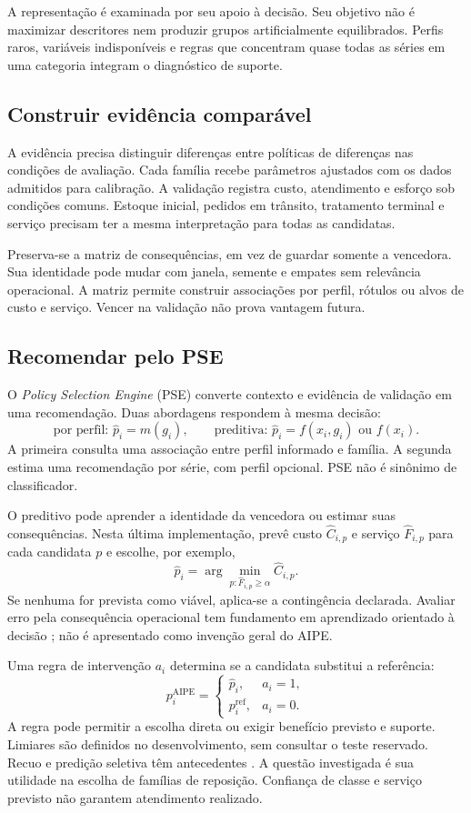 A representação é examinada por seu apoio à decisão. Seu objetivo não é maximizar descritores nem produzir grupos artificialmente equilibrados. Perfis raros, variáveis indisponíveis e regras que concentram quase todas as séries em uma categoria integram o diagnóstico de suporte.

\subsection{Construir evidência comparável}
A evidência precisa distinguir diferenças entre políticas de diferenças nas condições de avaliação. Cada família recebe parâmetros ajustados com os dados admitidos para calibração. A validação registra custo, atendimento e esforço sob condições comuns. Estoque inicial, pedidos em trânsito, tratamento terminal e serviço precisam ter a mesma interpretação para todas as candidatas.

Preserva-se a matriz de consequências, em vez de guardar somente a vencedora. Sua identidade pode mudar com janela, semente e empates sem relevância operacional. A matriz permite construir associações por perfil, rótulos ou alvos de custo e serviço. Vencer na validação não prova vantagem futura.

\subsection{Recomendar pelo PSE}
O \textit{Policy Selection Engine} (PSE) converte contexto e evidência de validação em uma recomendação. Duas abordagens respondem à mesma decisão:
\[
 \text{por perfil: }\widehat p_i=m(g_i),\qquad
 \text{preditiva: }\widehat p_i=f(x_i,g_i)\text{ ou }f(x_i).
\]
A primeira consulta uma associação entre perfil informado e família. A segunda estima uma recomendação por série, com perfil opcional. PSE não é sinônimo de classificador.

O preditivo pode aprender a identidade da vencedora ou estimar suas consequências. Nesta última implementação, prevê custo $\widehat C_{i,p}$ e serviço $\widehat F_{i,p}$ para cada candidata $p$ e escolhe, por exemplo,
\[
 \widehat p_i=\arg\min_{p:\widehat F_{i,p}\geq\alpha}\widehat C_{i,p}.
\]
Se nenhuma for prevista como viável, aplica-se a contingência declarada. Avaliar erro pela consequência operacional tem fundamento em aprendizado orientado à decisão \citep{ElmachtoubGrigas2022SPO}; não é apresentado como invenção geral do AIPE.

Uma regra de intervenção $a_i$ determina se a candidata substitui a referência:
\[
 p_i^{\mathrm{AIPE}}=
 \begin{cases}\widehat p_i,&a_i=1,\\p_i^{\mathrm{ref}},&a_i=0.\end{cases}
\]
A regra pode permitir a escolha direta ou exigir benefício previsto e suporte. Limiares são definidos no desenvolvimento, sem consultar o teste reservado. Recuo e predição seletiva têm antecedentes \citep{GeifmanElYaniv2019SelectiveNet,Laroche2019SPIBB}. A questão investigada é sua utilidade na escolha de famílias de reposição. Confiança de classe e serviço previsto não garantem atendimento realizado.

